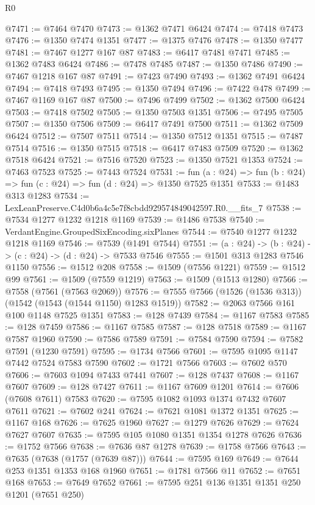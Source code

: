 \begin{lexlean}{R0}
\begin{coremodule}
@7471 := @7464 @7470
@7473 := @1362 @7471 @6424
@7474 := @7418 @7473
@7476 := @1350 @7474 @1351
@7477 := @1375 @7476
@7478 := @1350 @7477
@7481 := @7467 @1277 @167 @87
@7483 := @6417 @7481 @7471
@7485 := @1362 @7483 @6424
@7486 := @7478 @7485
@7487 := @1350 @7486
@7490 := @7467 @1218 @167 @87
@7491 := @7423 @7490
@7493 := @1362 @7491 @6424
@7494 := @7418 @7493
@7495 := @1350 @7494
@7496 := @7422 @478
@7499 := @7467 @1169 @167 @87
@7500 := @7496 @7499
@7502 := @1362 @7500 @6424
@7503 := @7418 @7502
@7505 := @1350 @7503 @1351
@7506 := @7495 @7505
@7507 := @1350 @7506
@7509 := @6417 @7491 @7500
@7511 := @1362 @7509 @6424
@7512 := @7507 @7511
@7514 := @1350 @7512 @1351
@7515 := @7487 @7514
@7516 := @1350 @7515
@7518 := @6417 @7483 @7509
@7520 := @1362 @7518 @6424
@7521 := @7516 @7520
@7523 := @1350 @7521 @1353
@7524 := @7463 @7523
@7525 := @7443 @7524
@7531 := fun (a : @24) => fun (b : @24) => fun (c : @24) => fun (d : @24) => @1350 @7525 @1351
@7533 := @1483 @313 @1283
@7534 := LexLeanPreserve.C4d0b6a4c5e7f8cbdd929574849042597.R0.__fits_7
@7538 := @7534 @1277 @1232 @1218 @1169
@7539 := @1486 @7538
@7540 := VerdantEngine.GroupedSixEncoding.sixPlanes
@7544 := @7540 @1277 @1232 @1218 @1169
@7546 := @7539 (@1491 @7544)
@7551 := (a : @24) -> (b : @24) -> (c : @24) -> (d : @24) -> @7533 @7546
@7555 := @1501 @313 @1283 @7546 @1150
@7556 := @1512 @208
@7558 := @1509 (@7556 @1221)
@7559 := @1512 @99
@7561 := @1509 (@7559 @1219)
@7563 := @1509 (@1513 @1280)
@7566 := @7558 (@7561 (@7563 @2069))
@7576 := @7555 @7566 (@1526 (@1536 @313)) (@1542 (@1543 (@1544 @1150) @1283 @1519))
@7582 := @2063 @7566 @161 @100 @1148 @7525 @1351
@7583 := @128 @7439
@7584 := @1167 @7583
@7585 := @128 @7459
@7586 := @1167 @7585
@7587 := @128 @7518
@7589 := @1167 @7587 @1960
@7590 := @7586 @7589
@7591 := @7584 @7590
@7594 := @7582 @7591 (@1230 @7591)
@7595 := @1734 @7566
@7601 := @7595 @1095 @1147 @7442 @7524 @7583 @7590
@7602 := @1721 @7566
@7603 := @7602 @570
@7606 := @7603 @1094 @7433 @7441
@7607 := @128 @7437
@7608 := @1167 @7607
@7609 := @128 @7427
@7611 := @1167 @7609 @1201
@7614 := @7606 (@7608 @7611) @7583
@7620 := @7595 @1082 @1093 @1374 @7432 @7607 @7611
@7621 := @7602 @241
@7624 := @7621 @1081 @1372 @1351
@7625 := @1167 @168
@7626 := @7625 @1960
@7627 := @1279 @7626
@7629 := @7624 @7627 @7607
@7635 := @7595 @105 @1080 @1351 @1354 @1278 @7626
@7636 := @1752 @7566
@7638 := @7636 @87 @1278
@7639 := @1758 @7566
@7643 := @7635 (@7638 (@1757 (@7639 @87)))
@7644 := @7595 @169
@7649 := @7644 @253 @1351 @1353 @168 @1960
@7651 := @1781 @7566 @11
@7652 := @7651 @168
@7653 := @7649 @7652
@7661 := @7595 @251 @136 @1351 @1351 @250 @1201 (@7651 @250)

\end{coremodule}
\end{lexlean}
